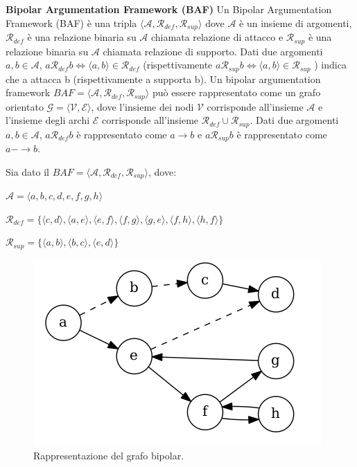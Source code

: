 \bigskip
\begin{defn} \textbf{Bipolar Argumentation Framework (BAF)} Un Bipolar Argumentation Framework (BAF) è una tripla $⟨\mathcal{A}, \mathcal{R}_{def}, \mathcal{R}_{sup}⟩$ dove $\mathcal{A}$ è un insieme di argomenti, $\mathcal{R}_{def}$ è una relazione binaria su $\mathcal{A}$ chiamata relazione di attacco e $\mathcal{R}_{sup}$ è una relazione binaria su $\mathcal{A}$ chiamata relazione di supporto. Dati due argomenti $a, b ∈ \mathcal{A}$, $a \mathcal{R}_{def} b ⇔ ⟨a, b⟩ ∈ \mathcal{R}_{def}$ (rispettivamente  $a \mathcal{R}_{sup} b ⇔ ⟨a, b⟩ ∈  \mathcal{R}_{sup}$ ) indica che a attacca b (rispettivamente a supporta b). Un bipolar argumentation framework $BAF = ⟨\mathcal{A}, \mathcal{R}_{def} , \mathcal{R}_{sup} ⟩$ può essere rappresentato come un grafo orientato $\mathcal{G} = ⟨\mathcal{V}, \mathcal{E}⟩$, dove l'insieme dei nodi $\mathcal{V}$ corrisponde all'insieme $\mathcal{A}$ e l'insieme degli archi $\mathcal{E}$ corrisponde all'insieme $\mathcal{R}_{def} ∪ \mathcal{R}_{sup}$. Dati due argomenti $a, b ∈ \mathcal{A}$, $a \mathcal{R}_{def} b$ è rappresentato come $a → b$ e $a \mathcal{R}_{sup} b$ è rappresentato come $a -→ b$.

\end{defn}

\bigskip
\begin{exmp}
    Sia dato il $BAF  = ⟨\mathcal{A}, \mathcal{R}_{def}, \mathcal{R}_{sup}⟩$, dove:
    \begin{center}
        $\mathcal{A} = ⟨a, b, c, d, e, f, g, h⟩$
        
        $\mathcal{R}_{def} = \{⟨c, d⟩, ⟨a, e⟩, ⟨e, f⟩, ⟨f, g⟩, ⟨g, e⟩, ⟨f, h⟩, ⟨h, f⟩\}$
        
        $\mathcal{R}_{sup} = \{⟨a, b⟩, ⟨b, c⟩, ⟨e, d⟩\}$
    \end{center}
    
    \begin{figure}
      \includegraphics[width=\linewidth]{Immagini/example-baf-graph.png}
      \caption{Rappresentazione del grafo bipolar.}
      \label{fig:baf-graph1}
    \end{figure}
    
    \label{exm:baf}
\end{exmp}

